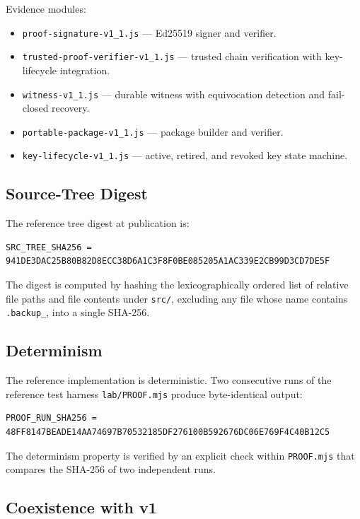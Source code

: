 \documentclass[11pt,a4paper]{article}
\begin{document}
Evidence modules:

\begin{itemize}
\item \texttt{proof-signature-v1\_1.js} --- Ed25519 signer and verifier.
\item \texttt{trusted-proof-verifier-v1\_1.js} --- trusted chain verification with key-lifecycle integration.
\item \texttt{witness-v1\_1.js} --- durable witness with equivocation detection and fail-closed recovery.
\item \texttt{portable-package-v1\_1.js} --- package builder and verifier.
\item \texttt{key-lifecycle-v1\_1.js} --- active, retired, and revoked key state machine.
\end{itemize}

\subsection{Source-Tree Digest}

The reference tree digest at publication is:

\begin{lstlisting}
SRC_TREE_SHA256 = 941DE3DAC25B80B82D8ECC38D6A1C3F8F0BE085205A1AC339E2CB99D3CD7DE5F
\end{lstlisting}

The digest is computed by hashing the lexicographically ordered list of relative file paths and file contents under \texttt{src/}, excluding any file whose name contains \texttt{.backup\_}, into a single SHA-256.

\subsection{Determinism}

The reference implementation is deterministic. Two consecutive runs of the reference test harness \texttt{lab/PROOF.mjs} produce byte-identical output:

\begin{lstlisting}
PROOF_RUN_SHA256 = 48FF8147BEADE14AA74697B70532185DF276100B592676DC06E769F4C40B12C5
\end{lstlisting}

The determinism property is verified by an explicit check within \texttt{PROOF.mjs} that compares the SHA-256 of two independent runs.

\subsection{Coexistence with v1}
\end{document}
